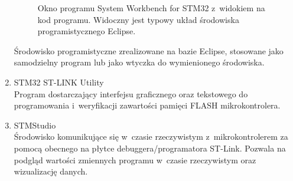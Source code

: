 \begin{enumerate}
\begin{figure}[h!]
		\caption{Okno programu System Workbench for STM32 z~widokiem na kod programu. Widoczny jest typowy układ środowiska programistycznego Eclipse.}
		\label{fig:sw4stm}
	\end{figure}
	Środowisko programistyczne zrealizowane na bazie Eclipse, stosowane jako samodzielny program lub jako wtyczka do wymienionego środowiska.
	\item STM32 ST-LINK Utility\\
	Program dostarczający interfejsu graficznego oraz tekstowego do programowania i~weryfikacji zawartości pamięci FLASH mikrokontrolera.
	\item STMStudio\\
	Środowisko komunikujące się w~czasie rzeczywistym z~mikrokontrolerem za pomocą obecnego na płytce debuggera/programatora ST-Link. Pozwala na podgląd wartości zmiennych programu w~czasie rzeczywistym oraz wizualizację danych.
\end{enumerate}	
